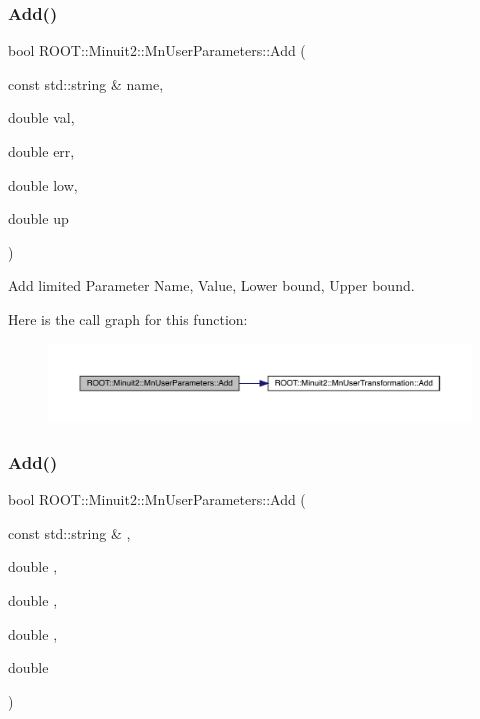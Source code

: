 \subsubsection{\texorpdfstring{Add()}{Add()}\hspace{0.1cm}{\footnotesize\ttfamily [5/9]}}
{\footnotesize\ttfamily bool R\+O\+O\+T\+::\+Minuit2\+::\+Mn\+User\+Parameters\+::\+Add (\begin{DoxyParamCaption}\item[{const std\+::string \&}]{name,  }\item[{double}]{val,  }\item[{double}]{err,  }\item[{double}]{low,  }\item[{double}]{up }\end{DoxyParamCaption})}



Add limited Parameter Name, Value, Lower bound, Upper bound. 

Here is the call graph for this function\+:
\nopagebreak
\begin{figure}[H]
\begin{center}
\leavevmode
\includegraphics[width=350pt]{d6/d10/classROOT_1_1Minuit2_1_1MnUserParameters_ab5e82031e879bf6937975b884784c126_cgraph}
\end{center}
\end{figure}
\mbox{\label{classROOT_1_1Minuit2_1_1MnUserParameters_ab5e82031e879bf6937975b884784c126}} 
\subsubsection{\texorpdfstring{Add()}{Add()}\hspace{0.1cm}{\footnotesize\ttfamily [6/9]}}
{\footnotesize\ttfamily bool R\+O\+O\+T\+::\+Minuit2\+::\+Mn\+User\+Parameters\+::\+Add (\begin{DoxyParamCaption}\item[{const std\+::string \&}]{,  }\item[{double}]{,  }\item[{double}]{,  }\item[{double}]{,  }\item[{double}]{ }\end{DoxyParamCaption})}



